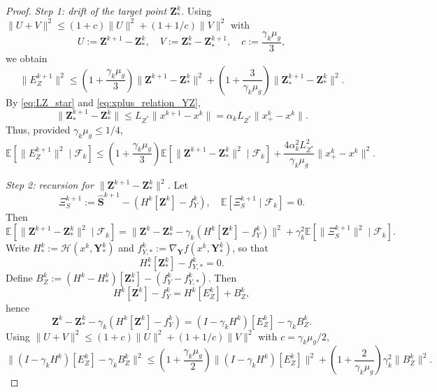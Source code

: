 \documentclass{pkumelon}
\theoremstyle{plain}
\newcommand{\E}{\mathbb{E}}
\begin{document}
\begin{proof}
\emph{Step 1: drift of the target point $\boldsymbol Z_*^k$.} Using $\|U+V\|^2\le (1+c)\|U\|^2+(1+1/c)\|V\|^2$ with
\begin{equation*}
U:=\boldsymbol Z^{k+1}-\boldsymbol Z_*^k, \quad V:=\boldsymbol Z_*^k-\boldsymbol Z_*^{k+1}, \quad c:=\frac{\gamma_k\mu_g}{3},
\end{equation*}
we obtain
\begin{equation}\label{eq:Z_shift_1_product}
\|E_Z^{k+1}\|^2
\le
\left(1+\frac{\gamma_k\mu_g}{3}\right)\|\boldsymbol Z^{k+1}-\boldsymbol Z_*^k\|^2
+\left(1+\frac{3}{\gamma_k\mu_g}\right)\|\boldsymbol Z_*^{k+1}-\boldsymbol Z_*^k\|^2.
\end{equation}
By \eqref{eq:LZ_star} and \eqref{eq:xplus_relation_YZ},
\begin{equation*}
\|\boldsymbol Z_*^{k+1}-\boldsymbol Z_*^k\| \le L_{Z^*}\|x^{k+1}-x^k\| = \alpha_k L_{Z^*}\|x_+^k-x^k\|.
\end{equation*}
Thus, provided $\gamma_k\mu_g\le 1/4$,
\begin{equation}\label{eq:Z_shift_2_product}
\E[\|E_Z^{k+1}\|^2\mid \mathcal F_k]
\le
\left(1+\frac{\gamma_k\mu_g}{3}\right)\E[\|\boldsymbol Z^{k+1}-\boldsymbol Z_*^k\|^2\mid \mathcal F_k]
+\frac{4\alpha_k^2L_{Z^*}^2}{\gamma_k\mu_g}\|x_+^k-x^k\|^2.
\end{equation}

\emph{Step 2: recursion for $\|\boldsymbol Z^{k+1}-\boldsymbol Z_*^k\|^2$.} Let
\begin{equation*}
\Xi_S^{k+1} := \widehat{\boldsymbol S}^{k+1}-(H^k[\boldsymbol Z^k]-f_Y^k), \quad \E[\Xi_S^{k+1}\mid \mathcal F_k]=0.
\end{equation*}
Then
\begin{equation}\label{eq:Z_basic_decomp_product}
\E[\|\boldsymbol Z^{k+1}-\boldsymbol Z_*^k\|^2\mid \mathcal F_k]
=
\|\boldsymbol Z^k-\boldsymbol Z_*^k-\gamma_k(H^k[\boldsymbol Z^k]-f_Y^k)\|^2
+\gamma_k^2\E[\|\Xi_S^{k+1}\|^2\mid \mathcal F_k].
\end{equation}
Write $H_*^k:=\mathcal H(x^k,\boldsymbol Y_*^k)$ and $f_{Y,*}^k:=\nabla_{\boldsymbol Y}f(x^k,\boldsymbol Y_*^k)$, so that
\begin{equation*}
H_*^k[\boldsymbol Z_*^k]-f_{Y,*}^k=0.
\end{equation*}
Define $B_Z^k:=(H^k-H_*^k)[\boldsymbol Z_*^k]-(f_Y^k-f_{Y,*}^k)$. Then
\begin{equation*}
H^k[\boldsymbol Z^k]-f_Y^k=H^k[E_Z^k]+B_Z^k,
\end{equation*}
hence
\begin{equation*}
\boldsymbol Z^k-\boldsymbol Z_*^k-\gamma_k(H^k[\boldsymbol Z^k]-f_Y^k) =(I-\gamma_k H^k)[E_Z^k]-\gamma_k B_Z^k.
\end{equation*}
Using $\|U+V\|^2\le (1+c)\|U\|^2+(1+1/c)\|V\|^2$ with $c=\gamma_k\mu_g/2$,
\begin{equation}\label{eq:Z_split_bias_product}
\|(I-\gamma_k H^k)[E_Z^k]-\gamma_k B_Z^k\|^2
\le
\left(1+\frac{\gamma_k\mu_g}{2}\right)\|(I-\gamma_k H^k)[E_Z^k]\|^2
+\left(1+\frac{2}{\gamma_k\mu_g}\right)\gamma_k^2\|B_Z^k\|^2.
\end{equation}


\end{proof}
\end{document}
